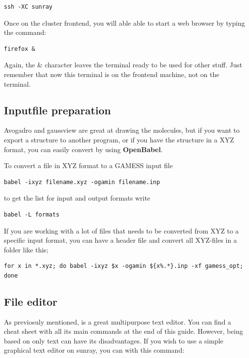 \documentclass{article}
\begin{document}
\begin{lstlisting}
ssh -XC sunray
\end{lstlisting}

Once on the cluster frontend, you will able able to start a web browser by typing the command:

\begin{lstlisting}
firefox &
\end{lstlisting}

Again, the \& character leaves the terminal ready to be used for other stuff. Just remember that now this terminal is on the frontend machine,
not on the terminal.

\subsection*{Inputfile preparation}

Avogadro and gaussview are great at drawing the molecules, but if you want to export a structure to another program, or if you have the structure in a XYZ format, you can easily convert by using {\bf OpenBabel}.

To convert a file in XYZ format to a GAMESS input file
\begin{lstlisting}
babel -ixyz filename.xyz -ogamin filename.inp
\end{lstlisting}

to get the list for input and output formats write

\begin{lstlisting}
babel -L formats
\end{lstlisting}

If you are working with a lot of files that needs to be converted from XYZ to a specific input format, you can have a header file  and convert all XYZ-files in a folder like this;

\begin{lstlisting}
for x in *.xyz; do babel -ixyz $x -ogamin ${x%.*}.inp -xf gamess_opt; done
\end{lstlisting}

\subsection*{File editor}

As previosuly mentioned,  is a great multipurpose text editor. You can find a cheat sheet with all its main commands at the end of this guide.
However, being based on only text can have its disadvantages. If you wish to use a simple graphical text editor on sunray, you can with this command:
\end{document}
